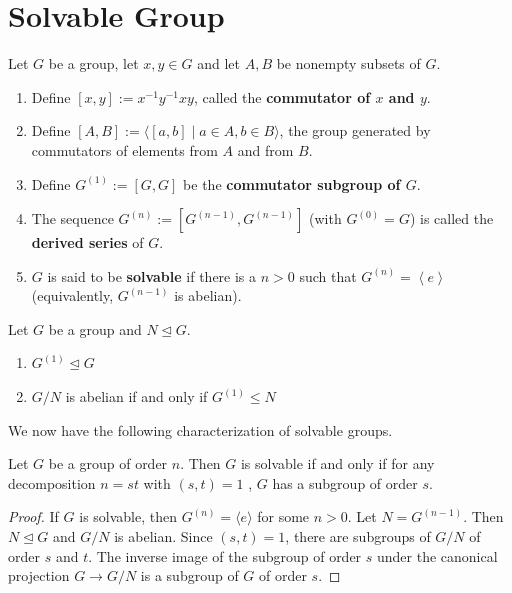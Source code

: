 \section{Solvable Group} %

\begin{definition}
    Let $G$ be a group, let $x, y \in G$ and let $A, B$ be nonempty subsets of $G$.
    \begin{enumerate}
        \item
              Define $[x, y]:=x^{-1} y^{-1} x y$, called the \textbf{commutator of $x$ and $y$}.

        \item
              Define $[A, B]:=\langle[a, b] \mid a \in A, b \in B\rangle$, the group generated by commutators of elements from $A$ and from $B$.

        \item
              Define $G^{(1)}:=[G, G]$ be the \textbf{commutator subgroup of $G$}.

        \item
              The sequence $G^{(n)} := [G^{(n-1)}, G^{(n-1)}]$ (with $G^{(0)}=G$) is called the \textbf{derived series} of $G$.
        \item
              $G$ is said to be \textbf{solvable} if there is a $n>0$ such that $G^{\left(n\right)}=\left\langle e \right\rangle$ (equivalently, $G^{(n-1)}$ is abelian).
    \end{enumerate}
\end{definition}
\begin{proposition}
    Let $G$ be a group and $N\unlhd G$.
    \begin{enumerate}
        \item
              $G^{(1)} \unlhd G$

        \item
              $G/N$ is abelian if and only if $G^{(1)} \leq N$
    \end{enumerate}
\end{proposition}
We now have the following characterization of solvable groups.
\begin{theorem}
    Let $G$ be a group of order $n$.
    Then $G$ is solvable if and only if for any decomposition $n=st$ with $\left(s,t\right)=1$ , $G$ has a subgroup of order $s$.
    \begin{proof}
        If $G$ is solvable, then $G^{(n)}=\langle e\rangle$ for some $n>0$. Let $N=G^{(n-1)}$. Then $N \unlhd G$ and $G / N$ is abelian. Since $\left(s, t\right)=1$, there are subgroups of $G / N$ of order $s$ and $t$. The inverse image of the subgroup of order $s$ under the canonical projection $G \rightarrow G / N$ is a subgroup of $G$ of order $s$.

    \end{proof}
\end{theorem}
